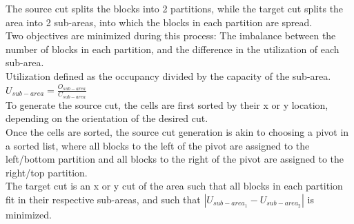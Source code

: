 \documentclass[twocolumn]{article}
\begin{document}
\begin{itemize}
            The source cut splits the blocks into 2 partitions, while the target cut splits the area into 2 sub-areas, into which the blocks in each partition are spread. \\
            Two objectives are minimized during this process: The imbalance between the number of blocks in each partition, and the difference in the utilization of each sub-area. \\
            Utilization defined as the occupancy divided by the capacity of the sub-area. \\
            \(U_{sub-area} = \frac{O_{sub-area}}{C_{sub-area}}\) \\
            To generate the source cut, the cells are first sorted by their x or y location, depending on the orientation of the desired cut. \\
            Once the cells are sorted, the source cut generation is akin to choosing a pivot in a sorted list, where all blocks to the left of the pivot are assigned to the left/bottom partition and all blocks to the right of the pivot are assigned to the right/top partition. \\
            The target cut is an x or y cut of the area such that all blocks in each partition fit in their respective sub-areas, and such that \( | U_{sub-area_1} 
             - U_{sub-area_2} | \) is minimized.




    \end{itemize}
\end{document}

